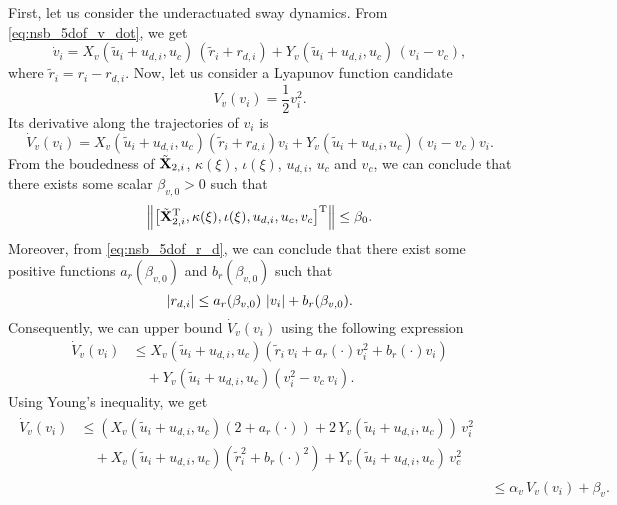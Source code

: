 First, let us consider the underactuated sway dynamics.
From \eqref{eq:nsb_5dof_v_dot}, we get
\begin{equation}
    \dot{v}_i = X_v\left(\tilde{u}_i + u_{d,i}, u_c\right)\,\left(\tilde{r}_i + r_{d,i}\right) + Y_v\left(\tilde{u}_i + u_{d,i}, u_c\right)\,\left(v_i - v_c\right),
\end{equation}
where $\tilde{r}_i = r_i - r_{d,i}$.
Now, let us consider a Lyapunov function candidate
\begin{equation}
    V_v(v_i) = \frac{1}{2} v_i^2. \label{eq:nsb_5dof_V_v}
\end{equation}
Its derivative along the trajectories of $v_i$ is
\begin{equation}
    \dot{V}_v(v_i) = X_v\!\left(\tilde{u}_i + u_{d,i}, u_c\right)\left(\tilde{r}_i + r_{d,i}\right)v_i + Y_v\!\left(\tilde{u}_i + u_{d,i}, u_c\right)\left(v_i - v_c\right)v_i. \label{eq:nsb_5dof_V_v_dot}
\end{equation}
From the boudedness of $\tilde{\mathbf{X}}_{2,i}$, $\kappa(\xi)$, $\iota(\xi)$, $u_{d,i}$, $u_c$ and $v_c$, we can conclude that there exists some scalar $\beta_{v,0} > 0$ such that
\begin{equation}
    \left\| \left[ \tilde{\mathbf{X}}_{2,i}^{\mathrm{T}}, \kappa(\xi), \iota(\xi), u_{d,i}, u_c, v_c \right]^{\mathrm{T}} \right\| \leq \beta_0.
\end{equation}
Moreover, from \eqref{eq:nsb_5dof_r_d}, we can conclude that there exist some positive functions $a_r(\beta_{v,0})$ and $b_r(\beta_{v,0})$ such that
\begin{equation}
    \left|r_{d,i}\right| \leq a_r(\beta_{v,0})\,\left|v_i\right| + b_r(\beta_{v,0}).
\end{equation}
Consequently, we can upper bound $\dot{V}_v(v_i)$ using the following expression
\begin{equation}
    \begin{split}
        \dot{V}_v(v_i) &\leq X_v\left(\tilde{u}_i + u_{d,i}, u_c\right)\left(\tilde{r}_i\,v_i + a_r(\cdot)v_i^2 + b_r(\cdot)v_i\right) \\
        &\quad + Y_v\left(\tilde{u}_i + u_{d,i}, u_c\right)\left(v_i^2 - v_c\,v_i\right).
    \end{split}
\end{equation}
Using Young's inequality, we get
\begin{subequations}
    \begin{align}
        \begin{split}
            \dot{V}_v(v_i) &\leq \left(X_v\left(\tilde{u}_i + u_{d,i}, u_c\right)\left(2 + a_r(\cdot)\right) + 2\,Y_v\left(\tilde{u}_i + u_{d,i}, u_c\right)\right)\,v_i^2 \\
             & \quad + X_v\left(\tilde{u}_i + u_{d,i}, u_c\right)\left(\tilde{r}_i^2 + b_r(\cdot)^2\right) + Y_v\left(\tilde{u}_i + u_{d,i}, u_c\right)\,v_c^2
        \end{split} \\
        & \leq \alpha_v\,V_v(v_i) + \beta_v.
    \end{align}
\end{subequations}
